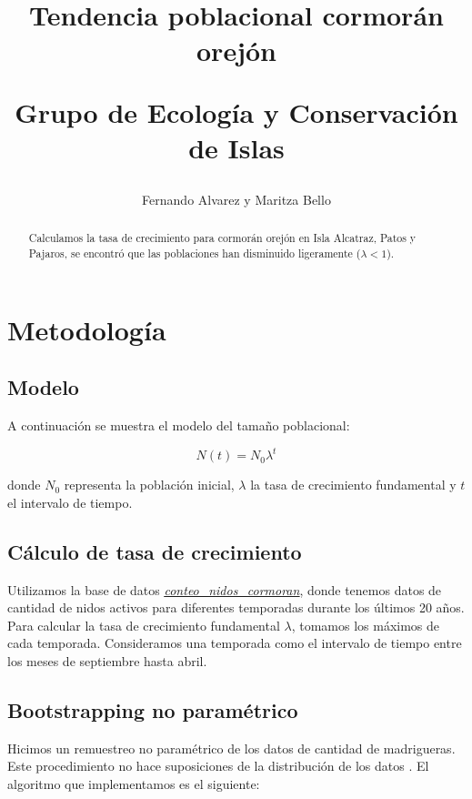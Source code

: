 \documentclass{article} %
\author{Fernando Alvarez y Maritza Bello}
\title{Tendencia poblacional cormorán orejón \\ \begin{large} Grupo de Ecología y Conservación de Islas \end{large}}
\begin{document}
\maketitle

\begin{abstract}
Calculamos la tasa de crecimiento para cormorán orejón en Isla Alcatraz, Patos y Pajaros, se encontró que las poblaciones han disminuido ligeramente ($\lambda < 1$).
\end{abstract}

\section*{Metodología}
\subsection*{Modelo}
A continuación se muestra el modelo del tamaño poblacional:

\begin{equation}
N(t)=N_{0}\lambda^{t}
\end{equation}

\noindent donde $N_{0}$ representa la población inicial, $\lambda$ la tasa de crecimiento fundamental y $t$ el intervalo de tiempo. 

\subsection*{Cálculo de tasa de crecimiento}

Utilizamos la base de datos \href{https://drive.google.com/drive/folders/1aXmotwcGcZjK52USWMdlZoffaMUlI0tT}{{\color{blue}\textit{\underline{conteo\_nidos\_cormoran}}}}, donde tenemos datos de cantidad de nidos activos para diferentes temporadas durante los últimos 20 años. Para calcular la tasa de crecimiento fundamental $\lambda$, tomamos los máximos de cada temporada. Consideramos una temporada como el intervalo de tiempo entre los meses de septiembre hasta abril.

\subsection*{Bootstrapping no paramétrico}

Hicimos un remuestreo no paramétrico de los datos de cantidad de madrigueras. Este procedimiento no hace suposiciones de la distribución de los datos \cite{carpenter2000bootstrap}. El algoritmo que implementamos es el siguiente: 
\end{document}
